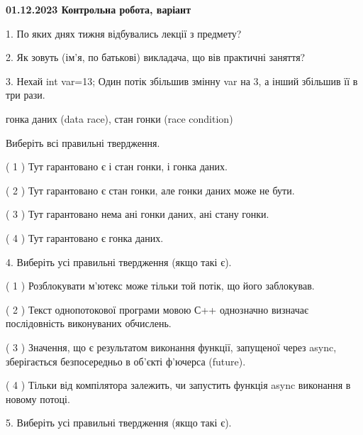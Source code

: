 \documentclass[12pt, ukrainian]{article}
\begin{document}
\vspace{4mm}
\newpage
\begin {large}

\textbf{01.12.2023 Контрольна робота, варіант  }\par


{
1. По яких днях тижня відбувались лекції з предмету?



\vspace{5mm}
2. Як зовуть (ім'я, по батькові) викладача, що вів практичні заняття?



\vspace{5mm}
3. Нехай int var=13; Один потік збільшив змінну var на 3, а інший збільшив її в три рази.

гонка даних (data race), стан гонки (race condition)

Виберіть всі правильні твердження.\par
\vspace{2mm}
( 1 ) Тут гарантовано є і стан гонки, і гонка даних.%

( 2 ) Тут гарантовано є стан гонки, але гонки даних може не бути.%

( 3 ) Тут гарантовано нема ані гонки даних, ані стану гонки.%

( 4 ) Тут гарантовано є гонка даних.%


\vspace{5mm}
4. Виберіть усі правильні твердження (якщо такі є).\par
\vspace{2mm}

( 1 ) Розблокувати м’ютекс може тільки той потік, що його заблокував.%

( 2 ) Текст однопотокової програми мовою С++ однозначно визначає послідовність виконуваних обчислень.%

( 3 ) Значення, що є результатом виконання функції, запущеної через async, зберігається безпосередньо в об’єкті ф’ючерса (future).%

( 4 ) Тільки від компілятора залежить, чи запустить функція async виконання в новому потоці.%


\vspace{5mm}
5. Виберіть усі правильні твердження (якщо такі є).\par
\vspace{2mm}

}
\end{large}
\end{document}

